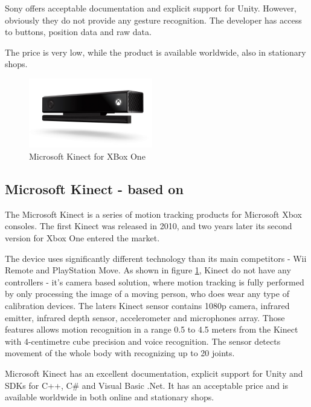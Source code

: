 Sony offers acceptable documentation and explicit support for Unity. However, obviously they do not provide any gesture recognition. The developer has access to buttons, position data and raw data. 

The price is very low, while the product is available worldwide, also in stationary shops.

\begin{figure}
\includegraphics[width=0.48\textwidth]{graphics/kinect.jpg} 
\caption{Microsoft Kinect for XBox One}
\vspace{-10pt}
\label{fig:kinect}
\end{figure}

\subsection{Microsoft Kinect - based on \cite{Kinect,kinect_spec,handpose}}

The Microsoft Kinect is a series of motion tracking products for Microsoft Xbox consoles. The first Kinect was released in 2010, and two years later its second version for Xbox One entered the market.

The device uses significantly different technology than its main competitors - Wii Remote and PlayStation Move. As shown in figure \ref{fig:kinect}, Kinect do not have any controllers - it's camera based solution, where motion tracking is fully performed by only processing the image of a moving person, who does wear any type of calibration devices. The laters Kinect sensor contains 1080p camera, infrared emitter, infrared depth sensor, accelerometer and microphones array. Those features allows motion recognition in a range 0.5 to 4.5 meters from the Kinect with 4-centimetre cube precision and voice recognition. The sensor detects movement of the whole body with recognizing up to 20 joints.

Microsoft Kinect has an excellent documentation, explicit support for Unity and SDKs for C++, C\# and Visual Basic .Net. It has an acceptable price and is available worldwide in both online and stationary shops.
 
